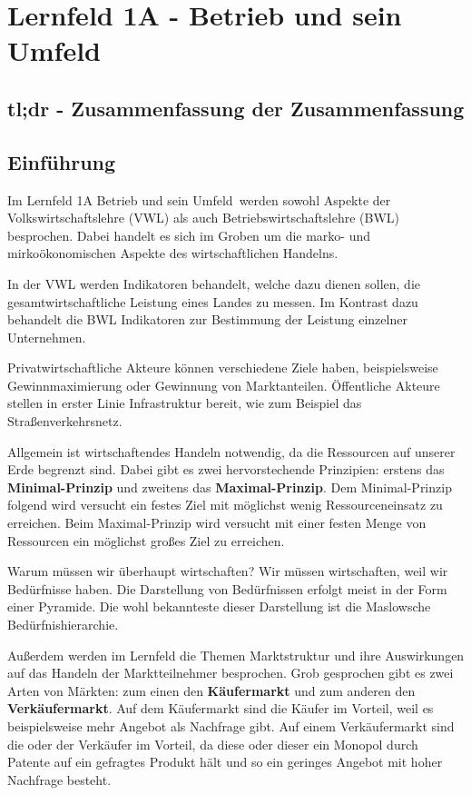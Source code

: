 \section{Lernfeld 1A - Betrieb und sein Umfeld}


\subsection{tl;dr - Zusammenfassung der Zusammenfassung}

\subsection{Einführung}
Im Lernfeld 1A \ql Betrieb und sein Umfeld\qr\ werden sowohl Aspekte der Volkswirtschaftslehre (VWL) als auch Betriebswirtschaftslehre (BWL) besprochen. Dabei handelt es sich im Groben um die marko- und mirkoökonomischen Aspekte des wirtschaftlichen Handelns.

In der VWL werden Indikatoren behandelt, welche dazu dienen sollen, die gesamtwirtschaftliche Leistung eines Landes zu messen. Im Kontrast dazu behandelt die BWL Indikatoren zur Bestimmung der Leistung einzelner Unternehmen.

Privatwirtschaftliche Akteure können verschiedene Ziele haben, beispielsweise Gewinnmaximierung oder Gewinnung von Marktanteilen. Öffentliche Akteure stellen in erster Linie Infrastruktur bereit, wie zum Beispiel das Straßenverkehrsnetz.

Allgemein ist wirtschaftendes Handeln notwendig, da die Ressourcen auf unserer Erde begrenzt sind. Dabei gibt es zwei hervorstechende Prinzipien: erstens das {\bf Minimal-Prinzip} und zweitens das {\bf Maximal-Prinzip}. Dem Minimal-Prinzip folgend wird versucht ein festes Ziel mit möglichst wenig Ressourceneinsatz zu erreichen. Beim Maximal-Prinzip wird versucht mit einer festen Menge von Ressourcen ein möglichst großes Ziel zu erreichen.

Warum müssen wir überhaupt wirtschaften? Wir müssen wirtschaften, weil wir Bedürfnisse haben. Die Darstellung von Bedürfnissen erfolgt meist in der Form einer Pyramide. Die wohl bekannteste dieser Darstellung ist die Maslowsche Bedürfnishierarchie.

Außerdem werden im Lernfeld die Themen Marktstruktur und ihre Auswirkungen auf das Handeln der Marktteilnehmer besprochen. Grob gesprochen gibt es zwei Arten von Märkten: zum einen den {\bf Käufermarkt} und zum anderen den {\bf Verkäufermarkt}. Auf dem Käufermarkt sind die Käufer im Vorteil, weil es beispielsweise mehr Angebot als Nachfrage gibt. Auf einem Verkäufermarkt sind die oder der Verkäufer im Vorteil, da diese oder dieser ein Monopol durch Patente auf ein gefragtes Produkt hält und so ein geringes Angebot mit hoher Nachfrage besteht.

